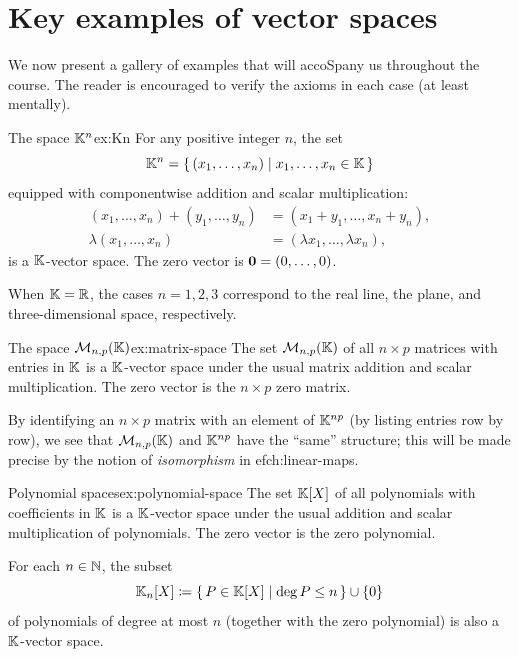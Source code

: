\section{Key examples of vector spaces}\label{sec:vs-examples}

We now present a gallery of examples that will accoSpany us throughout
the course. The reader is encouraged to verify the axioms in each case
(at least mentally).

\begin{example}{The space ${\mathbb{K}}^n$}{ex:Kn}
For any positive integer $n$, the set
\[
  {\mathbb{K}}^n = \left\{\,(x_1,\ldots,x_n)\;\middle|\;x_1,\ldots,x_n\in{\mathbb{K}}\,\right\}
\]
equipped with componentwise addition and scalar multiplication:
\begin{align*}
  (x_1,\ldots,x_n) + (y_1,\ldots,y_n) &= (x_1+y_1,\ldots,x_n+y_n), \\
  \lambda(x_1,\ldots,x_n) &= (\lambda x_1,\ldots,\lambda x_n),
\end{align*}
is a ${\mathbb{K}}$-vector space. The zero vector is $\mathbf{0} = (0,\ldots,0)$.

When ${\mathbb{K}} = {\mathbb{R}}$, the cases $n=1,2,3$ correspond to the real line, the
plane, and three-dimensional space, respectively.
\end{example}

\begin{example}{The space $\mathcal{M}_{n,p}({\mathbb{K}})$}{ex:matrix-space}
The set $\mathcal{M}_{n,p}({\mathbb{K}})$ of all $n\times p$ matrices with entries in ${\mathbb{K}}$
is a ${\mathbb{K}}$-vector space under the usual matrix addition and scalar
multiplication. The zero vector is the $n\times p$ zero matrix.

By identifying an $n\times p$ matrix with an element of ${\mathbb{K}}^{np}$ (by
listing entries row by row), we see that $\mathcal{M}_{n,p}({\mathbb{K}})$ and ${\mathbb{K}}^{np}$
have the ``same'' structure; this will be made precise by the notion of
\emph{isomorphism} in 
ef{ch:linear-maps}.
\end{example}

\begin{example}{Polynomial spaces}{ex:polynomial-space}
The set ${\mathbb{K}}[X]$ of all polynomials with coefficients in ${\mathbb{K}}$ is a
${\mathbb{K}}$-vector space under the usual addition and scalar multiplication of
polynomials. The zero vector is the zero polynomial.

For each $n\in{\mathbb{N}}$, the subset
\[
  {\mathbb{K}}_n[X] \coloneqq \left\{\,P\in{\mathbb{K}}[X]\;\middle|\;\deg P\leq n\,\right\}\cup\left\{0\right\}
\]
of polynomials of degree at most $n$ (together with the zero polynomial)
is also a ${\mathbb{K}}$-vector space.
\end{example}


